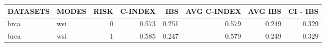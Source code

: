 \begin{tabular}{llrrrrrr}
\hline
 DATASETS   & MODES   &   RISK &   C-INDEX &   IBS &   AVG C-INDEX &   AVG IBS &   CI - IBS \\
\hline
 brca       & wsi     &      0 &     0.573 & 0.251 &         0.579 &     0.249 &      0.329 \\
 brca       & wsi     &      1 &     0.585 & 0.247 &         0.579 &     0.249 &      0.329 \\
\hline
\end{tabular}
